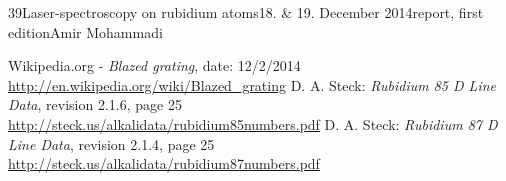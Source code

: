 \documentclass[a4paper, parskip=half, 12pt, bibliography=totocnumbered]{scrartcl}
\begin{document}
{39}{Laser-spectroscopy on rubidium atoms}{18. \& 19. December 2014}{report, first edition}{Amir Mohammadi}{}





\begin{thebibliography}{10}
 Wikipedia.org - \emph{Blazed grating}, date: 12/2/2014\\
\url{http://en.wikipedia.org/wiki/Blazed_grating}
 D. A. Steck: \emph{Rubidium 85 D Line Data}, revision 2.1.6, page 25\\
\url{http://steck.us/alkalidata/rubidium85numbers.pdf}
 D. A. Steck: \emph{Rubidium 87 D Line Data}, revision 2.1.4, page 25\\
\url{http://steck.us/alkalidata/rubidium87numbers.pdf}
\end{thebibliography}
\end{document}
